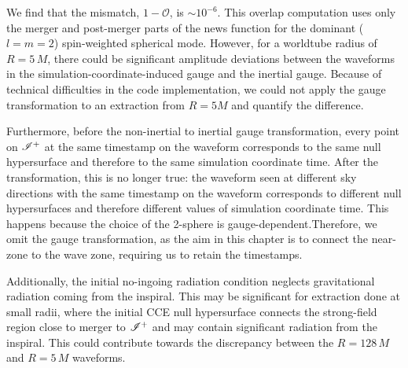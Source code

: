 We find that the mismatch, $1 - \mathcal{O}$, is $ \sim 10^{-6}$. This overlap computation uses only the merger and post-merger parts of the news function for the dominant ($l=m=2$) spin-weighted spherical mode. However, for a worldtube radius of $R=5\,M$, there could be significant amplitude deviations between the waveforms in the simulation-coordinate-induced gauge and the inertial gauge. Because of technical difficulties in the code implementation, we could not apply the gauge transformation to an extraction from $R=5 M$ and quantify the difference.


Furthermore, before the non-inertial to inertial gauge transformation, every point on $\mathscr{I^+}$ at the same timestamp on the waveform corresponds to the same null hypersurface and therefore to the same simulation coordinate time. After the transformation, this is no longer true: the waveform seen at different sky directions with the same timestamp on the waveform corresponds to different null hypersurfaces and therefore different values of simulation coordinate time. This happens because the choice of the 2-sphere is gauge-dependent.Therefore, we omit the gauge transformation, as the aim in this chapter is to connect the near-zone to the wave zone, requiring us to retain the timestamps.


Additionally, the initial no-ingoing radiation condition neglects gravitational radiation coming from the inspiral. This may be significant for extraction done at small radii, where the initial CCE null hypersurface connects the strong-field region close to merger to $\mathscr{I^+}$ and may contain significant radiation from the inspiral. This could contribute towards the discrepancy between the $R=128\,M$ and $R=5\,M$ waveforms. 

